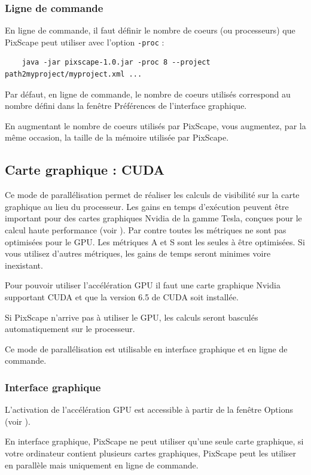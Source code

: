 \documentclass{report}
\begin{document}
\subsubsection{Ligne de commande}
En ligne de commande, il faut définir le nombre de coeurs (ou processeurs) que PixScape peut utiliser avec l'option \verb|-proc| :
\begin{Verbatim}
	java -jar pixscape-1.0.jar -proc 8 --project path2myproject/myproject.xml ...
\end{Verbatim}
Par défaut, en ligne de commande, le nombre de coeurs utilisés correspond au nombre défini dans la fenêtre Préférences de l'interface graphique.

En augmentant le nombre de coeurs utilisés par PixScape, vous augmentez, par la même occasion, la taille de la mémoire utilisée par PixScape.

\subsection{Carte graphique : CUDA}
\label{cuda}
Ce mode de parallélisation permet de réaliser les calculs de visibilité sur la carte graphique au lieu du processeur. Les gains en temps d'exécution peuvent être important pour des cartes graphiques Nvidia de la gamme Tesla, conçues pour le calcul haute performance (voir ). Par contre toutes les métriques ne sont pas optimisées pour le GPU. Les métriques A et S sont les seules à être optimisées. Si vous utilisez d'autres métriques, les gains de temps seront minimes voire inexistant.

Pour pouvoir utiliser l'accélération GPU il faut une carte graphique Nvidia supportant CUDA et que la version 6.5 de CUDA soit installée. 

Si PixScape n'arrive pas à utiliser le GPU, les calculs seront basculés automatiquement sur le processeur.

Ce mode de parallélisation est utilisable en interface graphique et en ligne de commande.

\subsubsection{Interface graphique}

L'activation de l'accélération GPU est accessible à partir de la fenêtre Options (voir ).

En interface graphique, PixScape ne peut utiliser qu'une seule carte graphique, si votre ordinateur contient plusieurs cartes graphiques, PixScape peut les utiliser en parallèle mais uniquement en ligne de commande.
\end{document}
